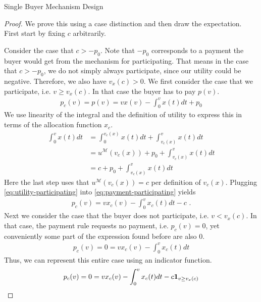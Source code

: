 \documentclass[11pt,a4paper]{article}
\newcommand{\1}[1]{\mbox{\rm\bf 1}_{#1}}
\newcommand{\eqdot}{\text{ .}}
\begin{document}
\begin{section}{Single Buyer Mechanism Design}
 \begin{proof}
     We prove this using a case distinction and then draw the expectation.
     First start by fixing $c$ arbitrarily.

     Consider the case that $c > -p_0$. Note that $-p_0$ corresponds to a payment the buyer would get from the mechanism for participating.
     That means in the case that $c > -p_0$, we do not simply always participate, since our utility could be negative. Therefore, we also have $v_x(c) > 0$.
     We first consider the case that we participate, i.e. $v \geq v_x(c)$.
     In that case the buyer has to pay $p(v)$.
     \begin{align}
         \label{eq:payment-participating}
         p_c(v) = p(v) = v x(v) - \int_0^v x(t) dt + p_0
     \end{align}
     We use linearity of the integral and the definition of utility to express this in terms of the allocation function $x_c$.
     \begin{equation}
         \label{eq:utility-participating}
         \begin{aligned}
             \int_0^v x(t) dt & = \int_0^{v_c(x)} x(t) dt + \int_{v_c(x)}^v x(t) dt     \\
                              & = u^\mathcal{M}(v_c(x)) + p_0 + \int_{v_c(x)}^v x(t) dt \\
                              & = c + p_0 + \int_{v_c(x)}^v x(t) dt
         \end{aligned}
     \end{equation}
     Here the last step uses that $u^\mathcal{M}(v_c(x)) = c$ per definition of $v_c(x)$.
     Plugging \cref{eq:utility-participating} into \cref{eq:payment-participating} yields
     \begin{align}
         \label{eq:payment-participating-final}
         p_c(v) = v x_c(v) - \int_0^v x_c(t) dt - c \eqdot
     \end{align}
     Next we consider the case that the buyer does not participate, i.e. $v < v_x(c)$.
     In that case, the payment rule requests no payment, i.e. $p_c(v) = 0$, yet conveniently some part of the expression found before are also $0$.
     \begin{align*}
         p_c(v) = 0 = v x_c(v) - \int_0^v x_c(t) dt
     \end{align*}
     Thus, we can represent this entire case using an indicator function.
     \begin{align*}
         p_c(v) = 0 = v x_c(v) - \int_0^v x_c(t) dt - c \1{v \geq v_x(c)}

\end{align*}
\end{proof}
\end{section}
\end{document}
